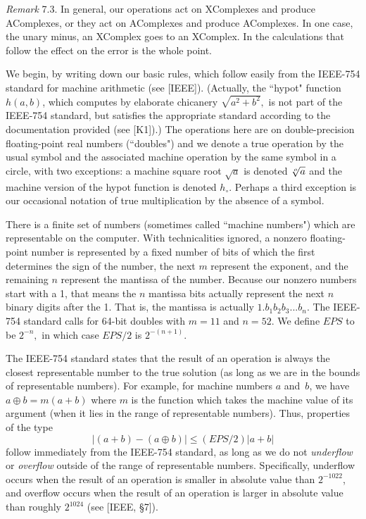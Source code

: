 {\it Remark} 7.3.
In general,  our operations  act on XComplexes and produce AComplexes, or they act on AComplexes and produce
 AComplexes.  In one case, the unary minus, an XComplex goes to an XComplex.  
In the calculations that follow the effect on the error is the whole point.

We begin, by writing down our basic rules, which follow easily from the IEEE-754 standard for machine arithmetic (see [IEEE]).
(Actually,  the ``hypot" function $h(a,b)$, which computes by elaborate chicanery $\sqrt{a^2 + b^2},$ is not part of the IEEE-754 standard, but  satisfies the appropriate standard according to the documentation provided (see [K1]).)  The operations here are on
double-precision floating-point real numbers (``doubles") and we denote a true operation by the usual symbol and the associated machine operation by the same symbol in a circle, with two exceptions: a machine square root $\sqrt a$ is denoted $\root o \of a$ and the machine version of the hypot function is denoted $h_\circ$.  Perhaps a third exception is our occasional notation of true multiplication by the absence of a symbol.  

There is a finite set of numbers (sometimes called ``machine numbers") which are representable on the computer.  With
technicalities ignored,    a nonzero floating-point number is represented by a fixed number of bits of which
the first determines the sign of the number, the next $m$ represent the exponent, and the remaining $n$ represent the
mantissa of the number.  Because our nonzero numbers start with a 1, that means the $n$ mantissa bits actually represent
the next
$n$ binary digits after the 1.  That is, the mantissa is actually $1.b_1b_2b_3...b_{n}.$   The IEEE-754 standard calls for
64-bit doubles with $m = 11$ and $n = 52.$  We define $EPS$ to be $2^{-n},$ in which case $EPS/2$ is $2^{-(n + 1)}.$  

The IEEE-754 standard states that the result of an operation
 is always the closest representable number to the true solution (as long as we are in the bounds of representable
numbers).  For example, for machine numbers $a$ and~$b$, we have $a \oplus b = m(a+b)$ where $m$ is the function which
takes the machine value of its argument (when it lies in the range of representable numbers).  Thus, properties of the type
$$|(a + b) - (a \oplus b)| \leq (EPS/2) |a + b|$$
follow immediately from the IEEE-754 standard, as long as we do not {\it underflow} or {\it overflow} outside of the range of representable numbers. 
Specifically, underflow occurs when the result of an operation is smaller in absolute value than $2^{-1022}$,
 and overflow occurs when the result of an operation is larger in absolute value than roughly $2^{1024}$
 (see [IEEE, \S 7]).

